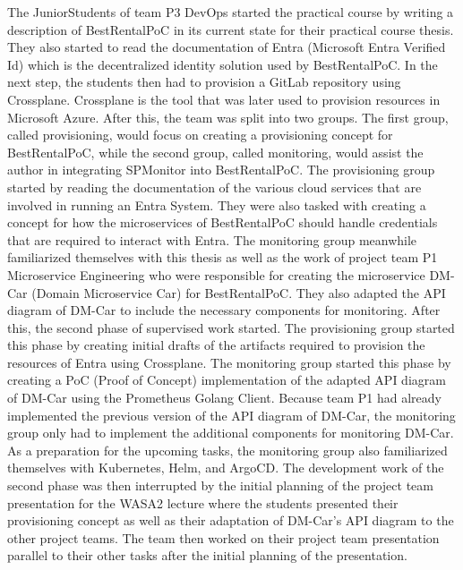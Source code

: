 The JuniorStudents of team P3 DevOps started the practical course by writing a description
of BestRentalPoC in its current state for their practical course thesis. They also started
to read the documentation of Entra (Microsoft Entra Verified Id) which is the decentralized identity
solution used by BestRentalPoC. In the next step, the students then had to provision
a GitLab repository using Crossplane. Crossplane is the tool that was later used to provision
resources in Microsoft Azure. After this, the team was split into two groups.
The first group, called provisioning, would focus on creating a provisioning concept for BestRentalPoC,
while the second group, called monitoring, would assist the author in integrating SPMonitor into BestRentalPoC.
The provisioning group started by reading the documentation of the various cloud services that are involved
in running an Entra System. They were also tasked with creating a concept
for how the microservices of BestRentalPoC should handle credentials that are required
to interact with Entra. The monitoring group meanwhile familiarized themselves with this thesis as well as
the work of project team P1 Microservice Engineering who were responsible for creating the microservice
DM-Car (Domain Microservice Car) for BestRentalPoC. They also adapted the API diagram of DM-Car
to include the necessary components for monitoring.
After this, the second phase of supervised work started. The provisioning group started this phase
by creating initial drafts of the artifacts required to provision the resources
of Entra using Crossplane. The monitoring group started this phase by creating a PoC (Proof of Concept)
implementation of the adapted API diagram of DM-Car using the Prometheus Golang Client. Because team P1
had already implemented the previous version of the API diagram of DM-Car, the monitoring group
only had to implement the additional components for monitoring DM-Car. As a preparation
for the upcoming tasks, the monitoring group also familiarized themselves with Kubernetes, Helm, and ArgoCD.
The development work of the second phase was then interrupted by the initial planning of the project team presentation
for the WASA2 lecture where the students presented their provisioning concept as well as their adaptation
of DM-Car's API diagram to the other project teams. The team then worked on their project team presentation
parallel to their other tasks after the initial planning of the presentation.

